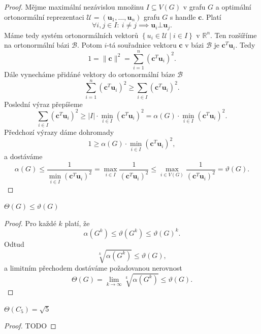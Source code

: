 \begin{proof}
    Mějme maximální nezávislou množinu $I \subseteq V(G)$ v grafu $G$ a optimální ortonormální reprezentaci $\mathcal{U} = \left(\mathbf{u}_1, \dots, \mathbf{u}_n \right)$ grafu $G$ s handle $\mathbf{c}$. Platí
    $$
        \forall i,j \in I:\ i \neq j \implies \mathbf{u}_i \bot \mathbf{u}_j.
    $$
    Máme tedy systém ortonormálních vektorů $\left\{ u_i \in \mathcal{U} \mid i \in I \right\}$ v $\mathbb{R}^n$. Ten rozšíříme na ortonormální bázi $\mathcal{B}$. Potom $i$-tá souřadnice vektoru $\mathbf{c}$ v bázi $\mathcal{B}$ je $\mathbf{c}^T \mathbf{u}_i$. Tedy
    $$
        1 = \|\mathbf{c}\|^2 = \sum_{i=1}^n \left( \mathbf{c}^T \mathbf{u}_i \right)^2.
    $$
    Dále vynecháme přidáné vektory do ortonormální báze $\mathcal{B}$
    $$
        \sum_{i=1}^n \left( \mathbf{c}^T \mathbf{u}_i \right)^2 \geq \sum_{i \in I} \left( \mathbf{c}^T \mathbf{u}_i \right)^2.
    $$
    Poslední výraz přepíšeme
    $$
        \sum_{i \in I} \left( \mathbf{c}^T \mathbf{u}_i \right)^2 \geq |I| \cdot \min_{i \in I}\left( \mathbf{c}^T \mathbf{u}_i \right)^2 = \alpha(G) \cdot \min_{i \in I}\left( \mathbf{c}^T \mathbf{u}_i \right)^2.
    $$
    Předchozí výrazy dáme dohromady
    $$
        1 \geq \alpha(G) \cdot \min_{i \in I}\left( \mathbf{c}^T \mathbf{u}_i \right)^2,
    $$
    a dostáváme
    $$
        \alpha(G) \leq \frac{1}{\min_{i \in I}\left( \mathbf{c}^T \mathbf{u}_i \right)^2} = \max_{i \in I} \frac{1}{\left( \mathbf{c}^T \mathbf{u}_i \right)^2} \leq \max_{i \in V(G)} \frac{1}{\left( \mathbf{c}^T \mathbf{u}_i \right)^2} = \vartheta(G).
    $$
\end{proof}

\begin{lm}
    $\Theta(G) \leq \vartheta(G)$
\end{lm}

\begin{proof}
    Pro každé $k$ platí, že
    $$
        \alpha(G^k) \leq \vartheta(G^k) \leq \vartheta(G)^k.
    $$
    Odtud
    $$
        \sqrt[k]{\alpha(G^k)} \leq \vartheta(G),
    $$
    a limitním přechodem dostáváme požadovanou nerovnost
    $$
        \Theta(G) = \lim_{k \to \infty} \sqrt[k]{\alpha(G^k)} \leq \vartheta(G).
    $$
\end{proof}

\begin{vt}
    $\Theta(C_5) = \sqrt{5}$
\end{vt}

\begin{proof}
    TODO
\end{proof}

